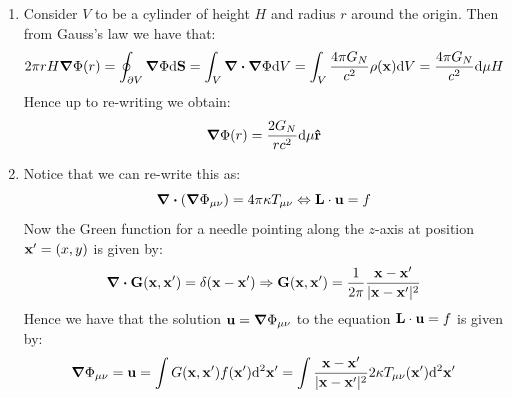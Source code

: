 \documentclass[10pt,a4paper]{article}
\begin{document}
\begin{enumerate}

\item Consider $V$ to be a cylinder of height $H$ and radius $r$ around the origin. Then from Gauss's law we have that:
\[
2 \pi r H \grad \Phi(r) = \oint_{\partial V} \grad \Phi \dd \vb{S} = \int_V \div \grad \Phi \dd V = \int_V \frac{4 \pi G_N}{c^2} \rho(\vb{x}) \dd V = \frac{4\pi G_N}{c^2} \dd \mu H  
\]
Hence up to re-writing we obtain:
\[
\grad \Phi(r) = \frac{2 G_N}{r c^2} \dd \mu \vu{r}
\]

\item Notice that we can re-write this as:
\[
\div (\grad \Phi_{\mu\nu}) = 4 \pi \kappa T_{\mu \nu} \Leftrightarrow \vb{L} \cdot \vb{u} = f
\]
Now the Green function for a needle pointing along the $z$-axis at position $\vb{x'} = (x, y)$ is given by:
\[
\div \vb{G(\vb{x}, \vb{x'})} = \delta(\vb{x} - \vb{x'}) \Rightarrow \vb{G}(\vb{x}, \vb{x'}) = \frac{1}{2\pi} \frac{\vb{x} - \vb{x'}}{|\vb{x} - \vb{x'}|^2}
\]
Hence we have that the solution $\vb{u} = \grad\Phi_{\mu\nu}$ to the equation $\vb{L} \cdot \vb{u} = f$ is given by:
\[
\grad \Phi_{\mu\nu} = \vb{u} = \int G(\vb{x}, \vb{x'}) f(\vb{x'}) \dd^2 \vb{x'} = \int \frac{\vb{x} - \vb{x'}}{|\vb{x} - \vb{x'}|^2} 2 \kappa T_{\mu\nu}(\vb{x'}) \dd^2 \vb{x'} 
\]


\end{enumerate}
\end{document}

